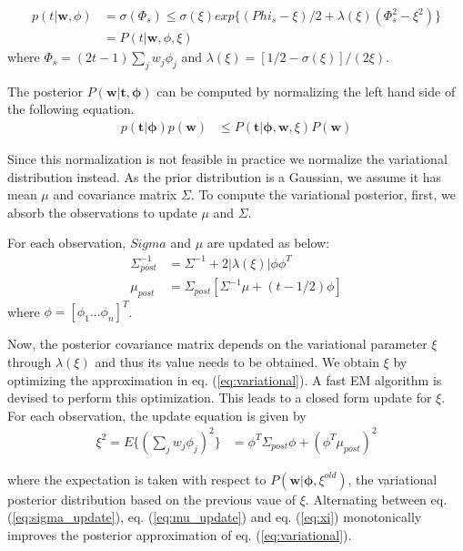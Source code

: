 \begin{align}
  p(t | \bm{w}, \phi) &= \sigma(\Phi_s) \leq \sigma(\xi) exp\{(Phi_s - \xi)/2 + \lambda(\xi)(\Phi_s^2 - \xi^2)\} \\
  &= P(t | \bm{w}, \phi, \xi)
\end{align}
where $\Phi_s = (2t - 1)\sum_jw_j\phi_j$ and $\lambda(\xi) = [1/2 - \sigma(\xi)]/(2\xi)$.

The posterior $P(\bm{w}|\bm{t}, \bm{\phi})$ can be computed by normalizing the left hand side of the following equation.
\begin{align}
\label{eq:variational}
p(\bm{t}|\bm{\phi})p(\bm{w}) &\leq P(\bm{t}|\bm{\phi}, \bm{w}, \xi)P(\bm{w})
\end{align}

Since this normalization is not feasible in practice we normalize the variational distribution instead. As the prior distribution is a Gaussian, we assume it has mean $\mu$ and covariance matrix $\Sigma$. To compute the variational posterior, first, we absorb the observations to update $\mu$ and $\Sigma$.

For each observation, $Sigma$ and $\mu$ are updated as below: 
\begin{align}
\label{eq:sigma_update}
\Sigma^{-1}_{post} &= \Sigma^{-1} + 2|\lambda(\xi)|\phi\phi^T\\
\label{eq:mu_update}
\mu_{post} &= \Sigma_{post}[\Sigma^{-1}\mu + (t - 1/2)\phi]
\end{align}
where $\phi = [\phi_1 ...\phi_n]^T$. 

Now, the posterior covariance matrix depends on the variational parameter $\xi$ through $\lambda(\xi)$ and thus its value needs to be obtained. We obtain $\xi$ by optimizing the approximation in eq. (\ref{eq:variational}). A fast EM algorithm is devised to perform this optimization. This leads to a closed form update for $\xi$. For each observation, the update equation is given by 
\begin{align}
\label{eq:xi}
\xi^2 = E\{(\sum_jw_j\phi_j)^2\} &= \phi^T\Sigma_{post}\phi + (\phi^T\mu_{post})^2
\end{align}

where the expectation is taken with respect to $P(\bm{w}|\bm{\phi}, \xi^{old})$, the variational posterior distribution based on the previous vaue of $\xi$. Alternating between eq. (\ref{eq:sigma_update}), eq. (\ref{eq:mu_update}) and eq. (\ref{eq:xi}) monotonically improves the posterior approximation of eq. (\ref{eq:variational}).

